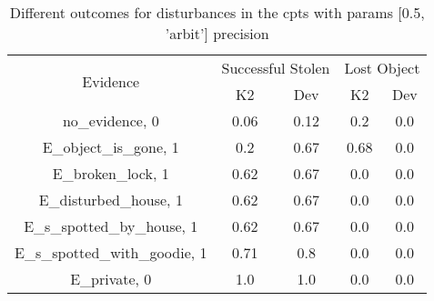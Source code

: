 \begin{table}\begin{tabular}{c|cc|cc}\toprule\multirow{2}{*}{Evidence} & \multicolumn{2}{c}{Successful Stolen} & \multicolumn{2}{c}{Lost Object} \\& {K2} & {Dev} & {K2} & {Dev} \\\midrule
no\_evidence, 0 & \cellcolor{Bittersweet}0.06&\cellcolor{Bittersweet}0.12&\cellcolor{Bittersweet}0.2&\cellcolor{Bittersweet}0.0\\E\_object\_is\_gone, 1 & \cellcolor{Bittersweet}0.2&\cellcolor{Bittersweet}0.67&\cellcolor{Bittersweet}0.68&\cellcolor{Bittersweet}0.0\\E\_broken\_lock, 1 & \cellcolor{Bittersweet}0.62&\cellcolor{Bittersweet}0.67&0.0&0.0\\E\_disturbed\_house, 1 & \cellcolor{Bittersweet}0.62&\cellcolor{Bittersweet}0.67&0.0&0.0\\E\_s\_spotted\_by\_house, 1 & \cellcolor{Bittersweet}0.62&\cellcolor{Bittersweet}0.67&0.0&0.0\\E\_s\_spotted\_with\_goodie, 1 & \cellcolor{Bittersweet}0.71&\cellcolor{Bittersweet}0.8&0.0&0.0\\E\_private, 0 & 1.0&1.0&0.0&0.0\\\bottomrule\end{tabular}\caption{Different outcomes for disturbances in the cpts with params [0.5, 'arbit'] precision}\end{table}